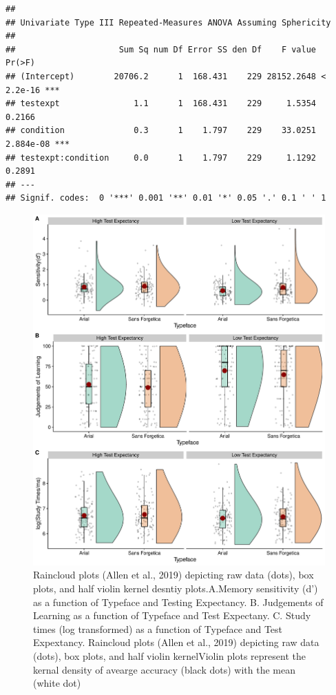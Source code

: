 \documentclass[
  english,
  man]{apa6}
\begin{document}
\begin{verbatim}
## 
## Univariate Type III Repeated-Measures ANOVA Assuming Sphericity
## 
##                     Sum Sq num Df Error SS den Df    F value    Pr(>F)    
## (Intercept)        20706.2      1  168.431    229 28152.2648 < 2.2e-16 ***
## testexpt               1.1      1  168.431    229     1.5354    0.2166    
## condition              0.3      1    1.797    229    33.0251 2.884e-08 ***
## testexpt:condition     0.0      1    1.797    229     1.1292    0.2891    
## ---
## Signif. codes:  0 '***' 0.001 '**' 0.01 '*' 0.05 '.' 0.1 ' ' 1
\end{verbatim}

\begin{figure}

{\centering \includegraphics{Testing_Expectancy_SF_files/figure-latex/unnamed-chunk-15-1} 

}

\caption{Raincloud plots (Allen et al., 2019) depicting raw data (dots), box plots, and half violin kernel desntiy plots.A.Memory sensitivity (d') as a function of Typeface and Testing Expectancy. B. Judgements of Learning as a function of Typeface and Test Expectany. C. Study times (log transformed) as a function of Typeface and Test Expextancy. Raincloud plots (Allen et al., 2019) depicting raw data (dots), box plots, and half violin kernelViolin plots represent the kernal density of avearge accuracy (black dots) with the mean (white dot)}\label{fig:unnamed-chunk-15}
\end{figure}
\end{document}
